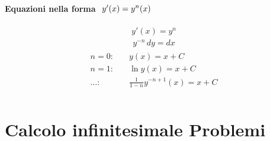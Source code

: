 \documentclass[letterpaper,10pt,italian]{jupyterBook}
\begin{document}
\subsubsection*{Equazioni nella forma \protect\(\ y'(x) = y^n(x)\protect\)}
\begin{equation*}
\begin{split}y'(x) = y^n\end{split}
\end{equation*}\begin{equation*}
\begin{split}y^{-n} \, dy = dx\end{split}
\end{equation*}\begin{equation*}
\begin{split}\begin{aligned}
 n = 0: & \quad  y(x) = x + C \\
 n = 1: & \quad  \ln y(x) = x + C \\
 \dots: & \quad  \frac{1}{1-n} y^{-n+1}(x) = x + C  \\
\end{aligned}\end{split}
\end{equation*}
\sphinxstepscope


\chapter{Calcolo infinitesimale \sphinxhyphen{} Problemi}
\label{\detokenize{ch/infinitesimal_calculus/problems:calcolo-infinitesimale-problemi}}\label{\detokenize{ch/infinitesimal_calculus/problems:infinitesimal-calculus-problems}}\label{\detokenize{ch/infinitesimal_calculus/problems::doc}}
\sphinxAtStartPar
{} 

\sphinxstepscope
\end{document}
